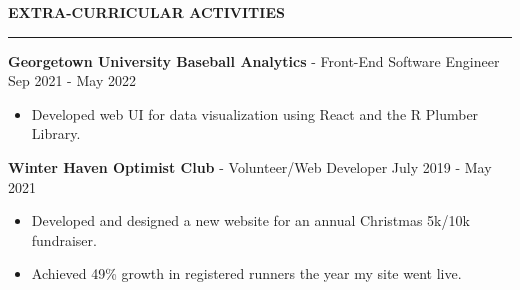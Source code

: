 \documentclass[11pt,letterpaper]{article}
\begin{document}
\medskip
\MakeUppercase{{\bf Extra-Curricular Activities}}
\medskip
\hrule
\begin{list}{}{\setlength{\leftmargin}{0em}}
    \item
          \textbf{Georgetown University Baseball Analytics} - Front-End Software Engineer \hfill Sep 2021 - May 2022
          \begin{itemize}
              \item Developed web UI for data visualization using React and the R Plumber Library.
          \end{itemize}

    \item
          \textbf{Winter Haven Optimist Club} - Volunteer/Web Developer \hfill July 2019 - May 2021
          \begin{itemize}
              \item Developed and designed a new website for an annual Christmas 5k/10k fundraiser.
              \item Achieved 49\% growth in registered runners the year my site went live.
          \end{itemize}
\end{list}


\end{document}
